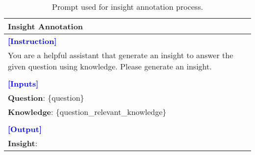 \begin{table*}[htbp]
\centering
\begin{tabularx}{\textwidth}{X}
\toprule
\textbf{Insight Annotation} \\ \midrule
\textcolor{blue}{\textbf{[Instruction]}} \\
You are a helpful assistant that generate an insight to answer the given question using knowledge. Please generate an insight. \\\\
\textcolor{blue}{\textbf{[Inputs]}} \\
\textbf{Question}: \{question\} \\
\textbf{Knowledge}: \{question\_relevant\_knowledge\} \\\\
\textcolor{blue}{\textbf{[Output]}} \\
\textbf{Insight}: \\ \bottomrule
\end{tabularx}
\caption{Prompt used for insight annotation process.}
\label{pmt:step3_3}
\end{table*}